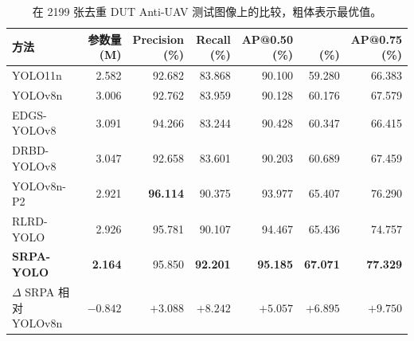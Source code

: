 \begin{table}[!t]
\caption{在 2199 张去重 DUT Anti-UAV 测试图像上的比较，粗体表示最优值。\label{tab:main}}
\centering\srpatablesetup
\begin{tabular}{lrrrrrr}\toprule
方法 & \shortstack{参数量\\(M)} & \shortstack{Precision\\(\%)} & \shortstack{Recall\\(\%)} & \shortstack{AP@0.50\\(\%)} & \shortstack{\mapall{}\\(\%)} & \shortstack{AP@0.75\\(\%)}\\\midrule
YOLO11n & 2.582 & 92.682 & 83.868 & 90.100 & 59.280 & 66.383\\
YOLOv8n & 3.006 & 92.762 & 83.959 & 90.128 & 60.176 & 67.579\\
EDGS-YOLOv8 & 3.091 & 94.266 & 83.244 & 90.428 & 60.347 & 66.415\\
DRBD-YOLOv8 & 3.047 & 92.658 & 83.601 & 90.203 & 60.689 & 67.459\\
YOLOv8n-P2 & 2.921 & \textbf{96.114} & 90.375 & 93.977 & 65.407 & 76.290\\
RLRD-YOLO & 2.926 & 95.781 & 90.107 & 94.467 & 65.436 & 74.757\\
\textbf{SRPA-YOLO} & \textbf{2.164} & 95.850 & \textbf{92.201} & \textbf{95.185} & \textbf{67.071} & \textbf{77.329}\\\midrule
$\Delta$ SRPA 相对 YOLOv8n & $-0.842$ & $+3.088$ & $+8.242$ & $+5.057$ & $+6.895$ & $+9.750$\\\bottomrule
\end{tabular}
\end{table}
